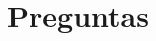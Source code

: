 \documentclass[11pt]{article}
\begin{document}


\section*{Preguntas}

\begin{enumerate}
    
    
\end{enumerate}
\end{document}
